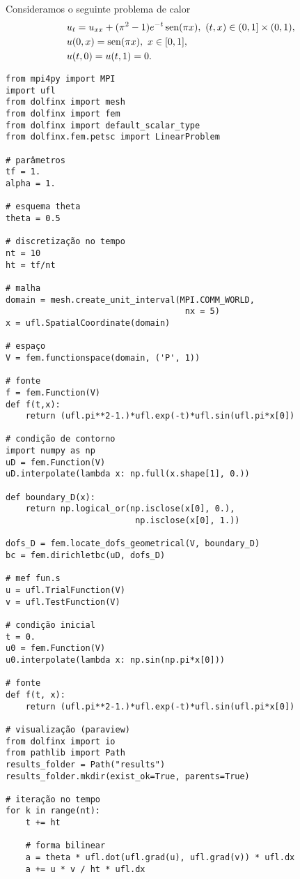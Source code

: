 \begin{ex}
  Consideramos o seguinte problema de calor
  \begin{subequations}
    \begin{align}
      &u_t = u_{xx} + (\pi^2-1)e^{-t}\operatorname{sen}(\pi x), ~(t,x)\in (0,1]\times (0,1),\\
      &u(0,x) = \operatorname{sen}(\pi x), ~x\in [0, 1],\\
      &u(t,0) = u(t,1) = 0.
    \end{align}
  \end{subequations}

\begin{lstlisting}
from mpi4py import MPI
import ufl
from dolfinx import mesh
from dolfinx import fem
from dolfinx import default_scalar_type
from dolfinx.fem.petsc import LinearProblem

# parâmetros
tf = 1.
alpha = 1.

# esquema theta
theta = 0.5

# discretização no tempo
nt = 10
ht = tf/nt

# malha
domain = mesh.create_unit_interval(MPI.COMM_WORLD,
                                    nx = 5)
x = ufl.SpatialCoordinate(domain)

# espaço
V = fem.functionspace(domain, ('P', 1))

# fonte
f = fem.Function(V)
def f(t,x):
    return (ufl.pi**2-1.)*ufl.exp(-t)*ufl.sin(ufl.pi*x[0])

# condição de contorno
import numpy as np
uD = fem.Function(V)
uD.interpolate(lambda x: np.full(x.shape[1], 0.))

def boundary_D(x):
    return np.logical_or(np.isclose(x[0], 0.),
                          np.isclose(x[0], 1.))

dofs_D = fem.locate_dofs_geometrical(V, boundary_D)
bc = fem.dirichletbc(uD, dofs_D)

# mef fun.s
u = ufl.TrialFunction(V)
v = ufl.TestFunction(V)

# condição inicial
t = 0.
u0 = fem.Function(V)
u0.interpolate(lambda x: np.sin(np.pi*x[0]))

# fonte
def f(t, x):
    return (ufl.pi**2-1.)*ufl.exp(-t)*ufl.sin(ufl.pi*x[0])

# visualização (paraview)
from dolfinx import io
from pathlib import Path
results_folder = Path("results")
results_folder.mkdir(exist_ok=True, parents=True)

# iteração no tempo
for k in range(nt):
    t += ht

    # forma bilinear
    a = theta * ufl.dot(ufl.grad(u), ufl.grad(v)) * ufl.dx
    a += u * v / ht * ufl.dx


\end{lstlisting}
\end{ex}
